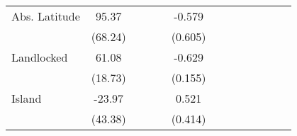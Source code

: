 \begin{sidewaystable}[h!]
\begin{threeparttable}
\begin{center}
\begin{minipage}{\textwidth}
\begin{tabular*}{\textwidth}{@{\extracolsep{\fill}}lcccccccccccc@{\extracolsep{\fill}}}
Abs. Latitude   &       95.37         &                     &                     &                     &      -0.579         &                     &                     &                     \\
            &     (68.24)         &                     &                     &                     &     (0.605)         &                     &                     &                     \\
[0.5em]
Landlocked    &       61.08\sym{***}&                     &                     &                     &      -0.629\sym{***}&                     &                     &                     \\
            &     (18.73)         &                     &                     &                     &     (0.155)         &                     &                     &                     \\
[0.5em]
Island      &      -23.97         &                     &                     &                     &       0.521         &                     &                     &                     \\
            &     (43.38)         &                     &                     &                     &     (0.414)         &                     &                     &                     \\
[0.5em]

\end{tabular*}
\end{minipage}
\end{center}
\end{threeparttable}
\end{sidewaystable}
